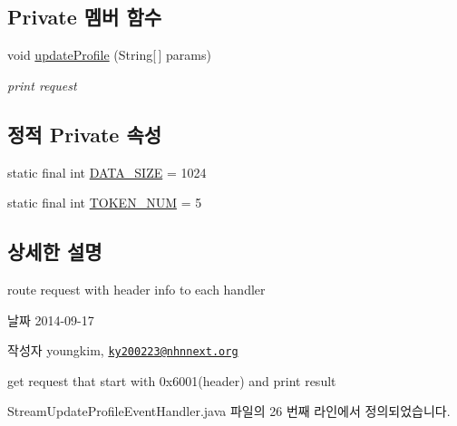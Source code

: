 \subsection*{Private 멤버 함수}
\begin{DoxyCompactItemize}
\item 
void \hyperlink{classweek8__server_1_1_stream_update_profile_event_handler_ab2a9e69d8c970f9f8ea254337f53f558}{update\-Profile} (String\mbox{[}$\,$\mbox{]} params)
\begin{DoxyCompactList}\small\item\em print request \end{DoxyCompactList}\end{DoxyCompactItemize}
\subsection*{정적 Private 속성}
\begin{DoxyCompactItemize}
\item 
static final int \hyperlink{classweek8__server_1_1_stream_update_profile_event_handler_aa635f419e6b73e10089f152538ce0b51}{D\-A\-T\-A\-\_\-\-S\-I\-Z\-E} = 1024
\item 
static final int \hyperlink{classweek8__server_1_1_stream_update_profile_event_handler_a23249215f663a5224287bb8e0c9d0588}{T\-O\-K\-E\-N\-\_\-\-N\-U\-M} = 5
\end{DoxyCompactItemize}


\subsection{상세한 설명}
route request with header info to each handler 

\begin{DoxyDate}{날짜}
2014-\/09-\/17 
\end{DoxyDate}
\begin{DoxyAuthor}{작성자}
youngkim, \href{mailto:ky200223@nhnnext.org}{\tt ky200223@nhnnext.\-org}
\end{DoxyAuthor}
get request that start with 0x6001(header) and print result 

Stream\-Update\-Profile\-Event\-Handler.\-java 파일의 26 번째 라인에서 정의되었습니다.



